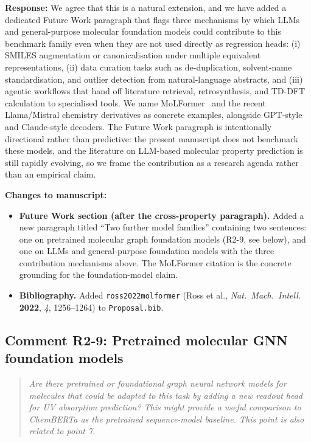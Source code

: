 \documentclass[11pt]{article}
\newenvironment{reviewer}{%
  \begin{quote}\itshape\color{black!70}}{%
  \end{quote}}
\newcommand{\response}[1]{\noindent\textbf{Response:} #1\par\medskip}
\newenvironment{changes}{%
  \noindent\textbf{Changes to manuscript:}
  \begin{itemize}[leftmargin=2em,itemsep=2pt]}{%
  \end{itemize}\medskip}
\begin{document}
\response{We agree that this is a natural extension, and we have added a dedicated Future Work paragraph that flags three mechanisms by which LLMs and general-purpose molecular foundation models could contribute to this benchmark family even when they are not used directly as regression heads: (i) SMILES augmentation or canonicalisation under multiple equivalent representations, (ii) data curation tasks such as de-duplication, solvent-name standardisation, and outlier detection from natural-language abstracts, and (iii) agentic workflows that hand off literature retrieval, retrosynthesis, and TD-DFT calculation to specialised tools. We name MoLFormer~\cite{ross2022molformer} and the recent Llama/Mistral chemistry derivatives as concrete examples, alongside GPT-style and Claude-style decoders. The Future Work paragraph is intentionally directional rather than predictive: the present manuscript does not benchmark these models, and the literature on LLM-based molecular property prediction is still rapidly evolving, so we frame the contribution as a research agenda rather than an empirical claim.}

\begin{changes}
  \item \textbf{Future Work section (after the cross-property paragraph).} Added a new paragraph titled ``Two further model families'' containing two sentences: one on pretrained molecular graph foundation models (R2-9, see below), and one on LLMs and general-purpose foundation models with the three contribution mechanisms above. The MoLFormer citation is the concrete grounding for the foundation-model claim.
  \item \textbf{Bibliography.} Added \texttt{ross2022molformer} (Ross et al., \textit{Nat.\ Mach.\ Intell.} \textbf{2022}, \textit{4}, 1256--1264) to \texttt{Proposal.bib}.
\end{changes}

\subsection*{Comment R2-9: Pretrained molecular GNN foundation models}
\begin{reviewer}
Are there pretrained or foundational graph neural network models for molecules that could be adapted to this task by adding a new readout head for UV absorption prediction? This might provide a useful comparison to ChemBERTa as the pretrained sequence-model baseline. This point is also related to point 7.
\end{reviewer}
\end{document}
